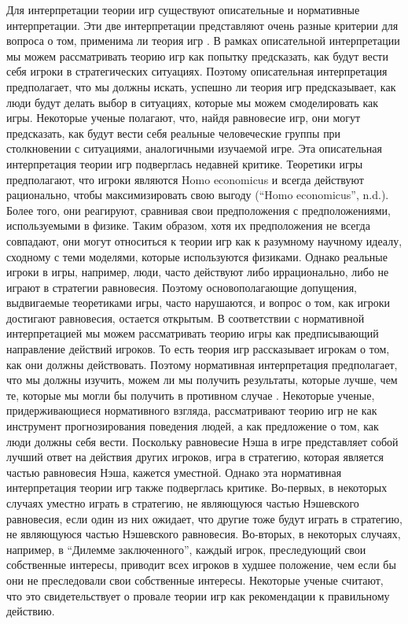 Для интерпретации теории игр существуют описательные и нормативные
интерпретации. Эти две интерпретации представляют очень разные критерии
для вопроса о том, применима ли теория игр \cite{Wooldridge:2012}. В рамках
описательной интерпретации мы можем рассматривать теорию игр как попытку
предсказать, как будут вести себя игроки в стратегических ситуациях.
Поэтому описательная интерпретация предполагает, что мы должны искать,
успешно ли теория игр предсказывает, как люди будут делать выбор в
ситуациях, которые мы можем смоделировать как игры. Некоторые ученые
полагают, что, найдя равновесие игр, они могут предсказать, как будут
вести себя реальные человеческие группы при столкновении с ситуациями,
аналогичными изучаемой игре. Эта описательная интерпретация теории игр
подверглась недавней критике. Теоретики игры предполагают, что игроки
являются Homo economicus и всегда действуют рационально, чтобы
максимизировать свою выгоду (``Homo economicus'', n.d.). Более того, они
реагируют, сравнивая свои предположения с предположениями, используемыми
в физике. Таким образом, хотя их предположения не всегда совпадают, они
могут относиться к теории игр как к разумному научному идеалу, сходному
с теми моделями, которые используются физиками. Однако реальные игроки в
игры, например, люди, часто действуют либо иррационально, либо не играют
в стратегии равновесия. Поэтому основополагающие допущения, выдвигаемые
теоретиками игры, часто нарушаются, и вопрос о том, как игроки достигают
равновесия, остается открытым. В соответствии с нормативной
интерпретацией мы можем рассматривать теорию игры как предписывающий
направление действий игроков. То есть теория игр рассказывает игрокам о
том, как они должны действовать. Поэтому нормативная интерпретация
предполагает, что мы должны изучить, можем ли мы получить результаты,
которые лучше, чем те, которые мы могли бы получить в противном случае
\cite{Wooldridge:2012}. Некоторые ученые, придерживающиеся нормативного
взгляда, рассматривают теорию игр не как инструмент прогнозирования
поведения людей, а как предложение о том, как люди должны себя вести.
Поскольку равновесие Нэша в игре представляет собой лучший ответ на
действия других игроков, игра в стратегию, которая является частью
равновесия Нэша, кажется уместной. Однако эта нормативная интерпретация
теории игр также подверглась критике. Во-первых, в некоторых случаях
уместно играть в стратегию, не являющуюся частью Нэшевского равновесия,
если один из них ожидает, что другие тоже будут играть в стратегию, не
являющуюся частью Нэшевского равновесия. Во-вторых, в некоторых случаях,
например, в ``Дилемме заключенного'', каждый игрок, преследующий свои
собственные интересы, приводит всех игроков в худшее положение, чем если
бы они не преследовали свои собственные интересы. Некоторые ученые
считают, что это свидетельствует о провале теории игр как рекомендации к
правильному действию.

